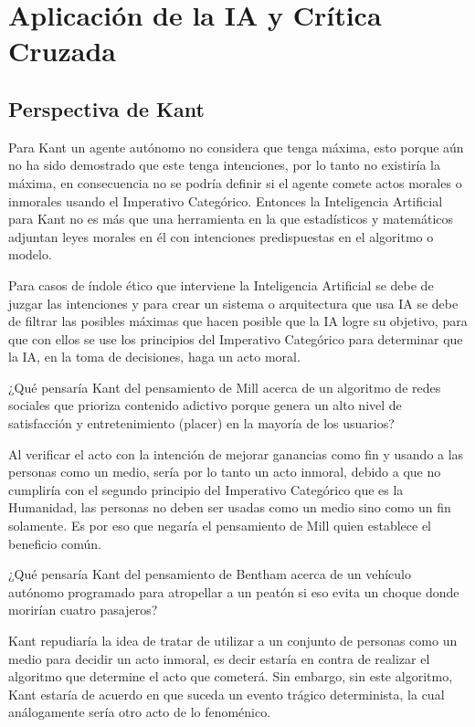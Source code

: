 \section{Aplicación de la IA y Crítica Cruzada}

\subsection{Perspectiva de Kant}

Para Kant un agente autónomo no considera que tenga máxima, esto porque aún no ha sido demostrado que este tenga intenciones, por lo tanto no existiría la máxima, en consecuencia no se podría definir si el agente comete actos morales o inmorales usando el Imperativo Categórico. Entonces la Inteligencia Artificial para Kant no es más que una herramienta en la que estadísticos y matemáticos adjuntan leyes morales en él con intenciones predispuestas en el algoritmo o modelo.

\medskip

Para casos de índole ético que interviene la Inteligencia Artificial se debe de juzgar las intenciones y para crear un sistema o arquitectura que usa IA se debe de filtrar las posibles máximas que hacen posible que la IA logre su objetivo, para que con ellos se use los principios del Imperativo Categórico para determinar que la IA, en la toma de decisiones, haga un acto moral.

\medskip

¿Qué pensaría Kant del pensamiento de Mill acerca de un algoritmo de redes sociales que prioriza contenido adictivo porque genera un alto nivel de satisfacción y entretenimiento (placer) en la mayoría de los usuarios?

Al verificar el acto con la intención de mejorar ganancias como fin y usando a las personas como un medio, sería por lo tanto un acto inmoral, debido a que no cumpliría con el segundo principio del Imperativo Categórico que es la Humanidad, las personas no deben ser usadas como un medio sino como un fin solamente. Es por eso que negaría el pensamiento de Mill quien establece el beneficio común.

\medskip

¿Qué pensaría Kant del pensamiento de Bentham acerca de un vehículo autónomo programado para atropellar a un peatón si eso evita un choque donde morirían cuatro pasajeros?

Kant repudiaría la idea de tratar de utilizar a un conjunto de personas como un medio para decidir un acto inmoral, es decir estaría en contra de realizar el algoritmo que determine el acto que cometerá. Sin embargo, sin este algoritmo, Kant estaría de acuerdo en que suceda un evento trágico determinista, la cual análogamente sería otro acto de lo fenoménico.

